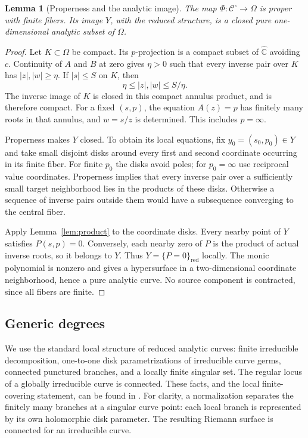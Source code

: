 \documentclass[11pt,reqno]{amsart}
\newtheorem{lemma}[theorem]{Lemma}
\theoremstyle{remark}
\numberwithin{equation}{section}
\newcommand{\C}{\mathbb C}
\newcommand{\Ps}{\widehat{\C}}
\newcommand{\red}{\mathrm{red}}
\begin{document}
\begin{lemma}[Properness and the analytic image]\label{lem:properimage}
The map $\Phi:\mathcal C^\circ\to\Omega$ is proper with finite
fibers. Its image $Y$, with the reduced structure, is a closed pure
one-dimensional analytic subset of $\Omega$.
\end{lemma}

\begin{proof}
Let $K\subset\Omega$ be compact. Its $p$-projection is a compact
subset of $\Ps$ avoiding $c$. Continuity of $A$ and $B$ at zero gives
$\eta>0$ such that every inverse pair over $K$ has
$|z|,|w|\ge\eta$. If $|s|\le S$ on $K$, then
\begin{equation}\label{eq:properbounds}
 \eta\le|z|,|w|\le S/\eta.
\end{equation}
The inverse image of $K$ is closed in this compact annulus product,
and is therefore compact. For a fixed $(s,p)$, the equation $A(z)=p$
has finitely many roots in that annulus, and $w=s/z$ is determined.
This includes $p=\infty$.

Properness makes $Y$ closed. To obtain its local equations, fix
$y_0=(s_0,p_0)\in Y$ and take small disjoint disks around every first
and second coordinate occurring in its finite fiber. For finite $p_0$
the disks avoid poles; for $p_0=\infty$ use reciprocal value
coordinates. Properness implies that every inverse pair over a
sufficiently small target neighborhood lies in the products of these
disks. Otherwise a sequence of inverse pairs outside them would have
a subsequence converging to the central fiber.

Apply Lemma~\ref{lem:product} to the coordinate disks. Every nearby
point of $Y$ satisfies $P(s,p)=0$. Conversely, each nearby zero of $P$
is the product of actual inverse roots, so it belongs to $Y$. Thus
$Y=\{P=0\}_{\red}$ locally. The monic polynomial is nonzero and gives
a hypersurface in a two-dimensional coordinate neighborhood, hence a
pure analytic curve. No source component is contracted, since all
fibers are finite.
\end{proof}

\subsection{Generic degrees}
We use the standard local structure of reduced analytic curves: finite
irreducible decomposition, one-to-one disk parametrizations of
irreducible curve germs, connected punctured branches, and a locally
finite singular set. The regular locus of a globally irreducible
curve is connected. These facts, and the local finite-covering
statement, can be found in
\cite[\S6.7: Proposition~6.7.3, Theorems~6.7.4 and~6.7.6,
and Exercise~6.7.3]{Lebl2026}.
For clarity, a normalization separates the finitely many branches
at a singular curve point: each local branch is represented by its
own holomorphic disk parameter. The resulting Riemann surface is
connected for an irreducible curve.
\end{document}
